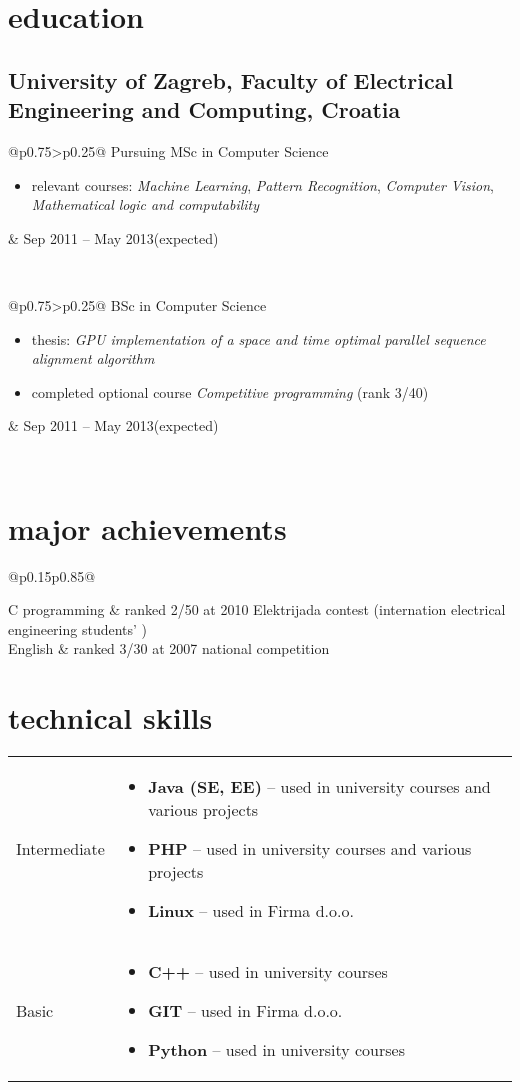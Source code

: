 \documentclass[a4paper]{article}
\makeatletter
\newlength{\tablewidth}
\newenvironment{period}[2]{%
\newcommand{\sarma}{#2}%
\setlength{\tablewidth}{\linewidth}
\addtolength{\tablewidth}{-2\tabcolsep}
\begin{tabular}{@{}p{0.75\tablewidth}>{\raggedleft\arraybackslash}p{0.25\tablewidth}@{}}%
#1 \newline
\begin{itemize}
}{%
\end{itemize} & \sarma \\%
\end{tabular}\\
}
\newenvironment{skills}{%
\setlength{\tablewidth}{\linewidth}
\addtolength{\tablewidth}{-2\tabcolsep}
\begin{tabular}{@{}p{0.15\tablewidth}p{0.85\tablewidth}@{}}
}{%
\end{tabular}
}
\makeatother
\begin{document}
\section{education}
\subsection{University of Zagreb, Faculty of Electrical Engineering and Computing, Croatia}
\begin{period}{Pursuing MSc in Computer Science}{Sep 2011 -- May 2013\linebreak(expected)}
    \item relevant courses:
        \textit{Machine Learning},
        \textit{Pattern Recognition},
        \textit{Computer Vision},
        \textit{Mathematical logic and computability}
\end{period}
\begin{period}{BSc in Computer Science}{Sep 2008 -- Jul 2011}
    \item thesis:
        \textit{GPU implementation of a space and time optimal parallel sequence alignment algorithm}
    \item completed optional course \textit{Competitive programming} (rank 3/40)
\end{period}

\section{major achievements}
\begin{skills}
    C programming   &   ranked 2/50 at 2010 Elektrijada contest (internation electrical engineering students' 
                        ) \\
    English         &   ranked 3/30 at 2007 national competition
\end{skills}

\section{technical skills}
\begin{skills}
    Intermediate &
    \begin{itemize}
        \item \textbf{Java (SE, EE)} -- used in university courses and various projects
        \item \textbf{PHP} -- used in university courses and various projects
        \item \textbf{Linux} -- used in Firma d.o.o.
    \end{itemize} \\
    Basic &
    \begin{itemize}
        \item \textbf{C++} -- used in university courses
        \item \textbf{GIT} -- used in Firma d.o.o.
        \item \textbf{Python} -- used in university courses
    \end{itemize} \\
\end{skills}
\end{document}
